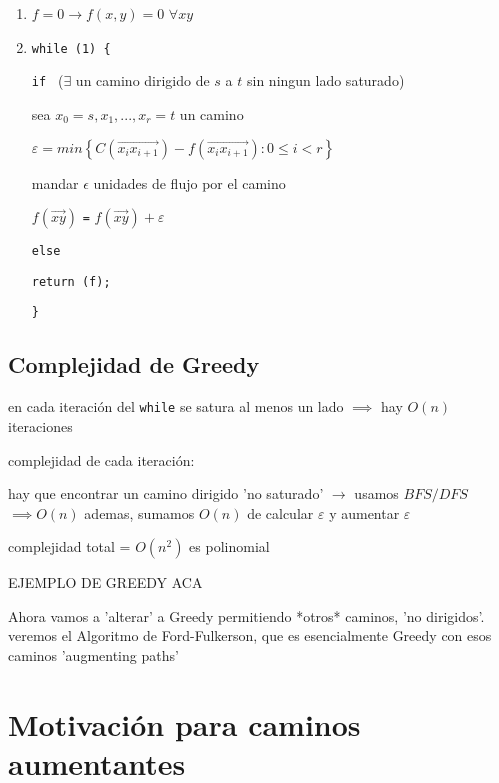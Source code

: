 \documentclass[12pt]{article}
\begin{document}
\begin{enumerate}
\item $f = 0 \rightarrow f(x,y) = 0$    $\forall xy$
\item
\texttt{while (1) \{}

\hspace{1em} \texttt{if } ($\exists$ un camino dirigido de $s$ a $t$ sin ningun lado saturado)

\hspace{3em} sea $x_0 = s, x_1, ..., x_r = t$ un camino

\hspace{3em} $\varepsilon = min \left\{C(\overrightarrow{x_ix_{i+1}}) - f(\overrightarrow{x_ix_{i+1}}) : 0 \leq i < r\right\}$

\hspace{3em} mandar $\epsilon$ unidades de flujo por el camino

\hspace{3em} $f(\overrightarrow{xy})$ \texttt{=} $f(\overrightarrow{xy}) + \varepsilon$

\hspace{1em} \texttt{else}

\hspace{3em} \texttt{return (f);}

\texttt{\}}
\end{enumerate}

\subsection*{Complejidad de Greedy}

en cada iteración del \texttt{while} se satura al menos un lado $\implies$ hay $O(n)$ iteraciones

complejidad de cada iteración:

hay que encontrar un camino dirigido 'no saturado' $\rightarrow$ usamos $BFS/DFS$ $\implies O(n)$
ademas, sumamos $O(n)$ de calcular $\varepsilon$ y aumentar $\varepsilon$

complejidad total = $O(n^2)$ es polinomial

EJEMPLO DE GREEDY ACA


Ahora vamos a 'alterar' a Greedy permitiendo *otros* caminos, 'no dirigidos'. veremos el Algoritmo de Ford-Fulkerson, que es esencialmente Greedy con esos caminos 'augmenting paths'

\section*{Motivación para caminos aumentantes}
\end{document}
